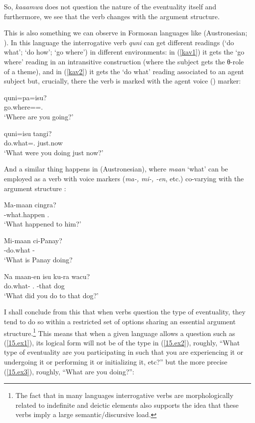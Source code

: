 \documentclass[output=paper]{langsci/langscibook}
\begin{document}
So, \emph{kaaamwa} does not question the nature of the eventuality itself and
furthermore, we see that the verb changes with the argument structure.

This is also something we can observe in Formosan languages like 
(Austronesian; \citealt[186]{lin2012}). In this language the interrogative verb
\emph{quni} can get different readings (`do what'; `do how'; `go where') in
different environments: in (\ref{kav1}) it gets the \enquote*{go where} reading in
an intransitive construction (where the subject gets the θ-role of a theme), and in (\ref{kav2}) it gets the \enquote*{do what}
reading associated to an agent subject but, crucially, there the verb is
marked with the agent voice (\Av{}) marker:

\begin{exe}
    \ex \label{kav1} 
\sn\gll quni=pa=isu?\\
go.where=\Fut{}=\Ssg.\Abs{}\\
\glt `Where are you going?'

\ex \label{kav2} 
\sn\gll quni=isu tangi?\\
\tuple{\Av}do.what=\Ssg.\Abs{} just.now\\
\glt `What were you doing just now?'
\end{exe}

And a similar thing happens in  (Austronesian), where \emph{maan} `what'
can be employed as a verb with voice markers (\emph{ma-, mi-, -en}, etc.)
co-varying with the argument structure \citep[192]{lin2012}:

\begin{exe}
\ex \label{amis1}
\sn\gll Ma-maan cingra?\\
\Av{}-what.happen \Ssg.\Abs{}\\
\glt `What happened to him?'

\ex \label{amis2}
\sn\gll Mi-maan ci-Panay?\\
\Av{}-do.what \Ncm{}-\Pn{}\\
\glt `What is Panay doing?

\ex \label{amis3}
\sn\gll Na maan-en isu ku-ra wacu?\\
\Pst{} do.what-\Pv{} \Ssg.\Erg{} \Abs{}-that dog\\
\glt `What did you do to that dog?'
\end{exe}

I shall conclude from this that when verbs question the type of eventuality,
they tend to do so within a restricted set of options sharing an essential
argument structure.\footnote{The fact that in many languages interrogative
verbs are morphologically related to indefinite and deictic elements
\citep[cf.][]{hagege2008} also supports the idea that these verbs imply
a large semantic/discursive load.} This means that when a given language allows
a question such as (\ref{15.ex1}), its logical form will not be of the type in
(\ref{15.ex2}), roughly, ``What type of eventuality are you participating in such
that you are experiencing it or undergoing it or performing it or initializing
it, etc?'' but the more precise (\ref{15.ex3}), roughly, ``What are you doing?'':
\end{document}
